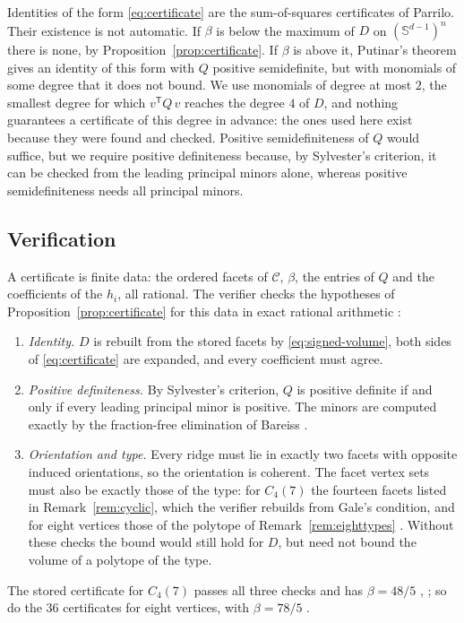\begin{remark}
  Identities of the form \eqref{eq:certificate} are the sum-of-squares
  certificates of Parrilo. Their existence is not automatic. If $\beta$ is
  below the maximum of $D$ on $(\mathbb{S}^{d-1})^{n}$ there is none, by
  Proposition~\ref{prop:certificate}. If $\beta$ is above it, Putinar's
  theorem gives an identity of this form with $Q$ positive semidefinite, but
  with monomials of some degree that it does not bound. We use monomials of
  degree at most $2$, the smallest degree for which $v^{\mathsf{T}} Q\, v$
  reaches the degree $4$ of $D$, and nothing guarantees a certificate of this
  degree in advance: the ones used here exist because they were found and
  checked. Positive semidefiniteness of $Q$ would suffice, but we require
  positive definiteness because, by Sylvester's criterion, it can be checked
  from the leading principal minors alone, whereas positive semidefiniteness
  needs all principal minors.
\end{remark}

\subsection{Verification}
\label{sec:verification}

A certificate is finite data: the ordered facets of $\mathcal{C}$, $\beta$,
the entries of $Q$ and the coefficients of the $h_{i}$, all rational. The
verifier checks the hypotheses of Proposition~\ref{prop:certificate} for this
data in exact rational arithmetic :
\begin{enumerate}
  \item \emph{Identity.} $D$ is rebuilt from the stored facets by
    \eqref{eq:signed-volume}, both sides of \eqref{eq:certificate} are
    expanded, and every coefficient must agree.
  \item \emph{Positive definiteness.} By Sylvester's criterion, $Q$ is
    positive definite if and only if every leading principal minor is
    positive. The minors are computed exactly by the fraction-free
    elimination of Bareiss \cite{bareiss-1968}.
  \item \emph{Orientation and type.} Every ridge must lie in exactly two facets with
    opposite induced orientations, so the orientation is coherent. The facet
    vertex sets must also be exactly those of the type: for $C_{4}(7)$ the
    fourteen facets listed in Remark~\ref{rem:cyclic}, which the verifier
    rebuilds from Gale's condition, and for eight vertices those of the
    polytope of Remark~\ref{rem:eighttypes} . Without these
    checks the bound would still hold for $D$, but need not bound the volume
    of a polytope of the type.
\end{enumerate}
The stored certificate for $C_{4}(7)$ passes all three checks and has
$\beta = 48/5$ , ; so do the $36$
certificates for eight vertices, with $\beta = 78/5$
.

